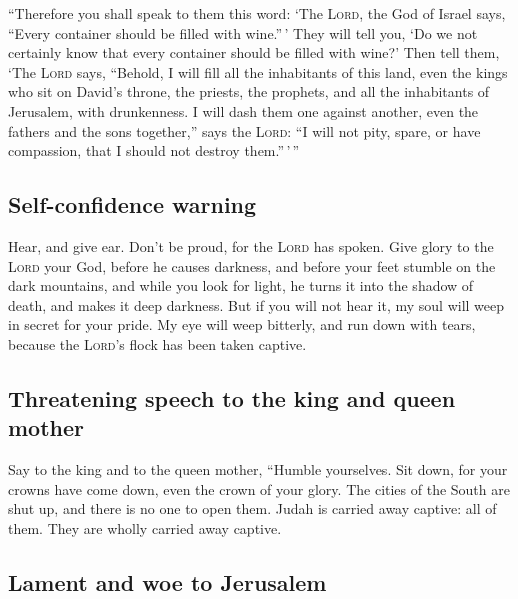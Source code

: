  ``Therefore you shall speak to them this word: `The
\textsc{Lord}, the God of Israel says, ``Every container should be
filled with wine.''\,' They will tell you, `Do we not certainly know
that every container should be filled with wine?'  Then
tell them, `The \textsc{Lord} says, ``Behold, I will fill all the
inhabitants of this land, even the kings who sit on David's throne, the
priests, the prophets, and all the inhabitants of Jerusalem, with
drunkenness.  I will dash them one against another, even
the fathers and the sons together,'' says the \textsc{Lord}: ``I will
not pity, spare, or have compassion, that I should not destroy
them.''\,'\,''

\hypertarget{self-confidence-warning}{%
\subsection{Self-confidence warning}\label{self-confidence-warning}}

 Hear, and give ear. Don't be proud, for the
\textsc{Lord} has spoken.  Give glory to the
\textsc{Lord} your God, before he causes darkness, and before your feet
stumble on the dark mountains, and while you look for light, he turns it
into the shadow of death, and makes it deep darkness. 
But if you will not hear it, my soul will weep in secret for your pride.
My eye will weep bitterly, and run down with tears, because the
\textsc{Lord}'s flock has been taken captive.

\hypertarget{threatening-speech-to-the-king-and-queen-mother}{%
\subsection{Threatening speech to the king and queen
mother}\label{threatening-speech-to-the-king-and-queen-mother}}

 Say to the king and to the queen mother, ``Humble
yourselves. Sit down, for your crowns have come down, even the crown of
your glory.  The cities of the South are shut up, and
there is no one to open them. Judah is carried away captive: all of
them. They are wholly carried away captive.

\hypertarget{lament-and-woe-to-jerusalem}{%
\subsection{Lament and woe to
Jerusalem}\label{lament-and-woe-to-jerusalem}}

